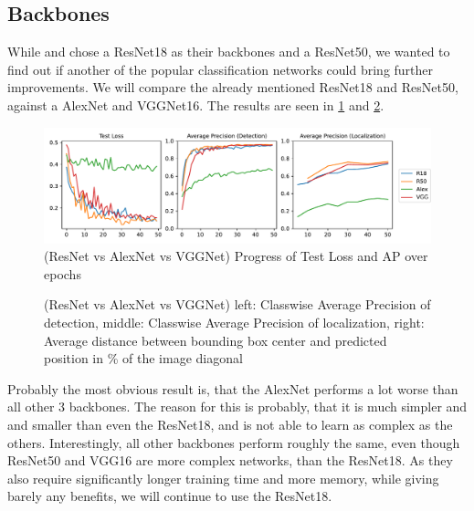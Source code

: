 \FloatBarrier
\subsection{Backbones}

While \cite{Vardazaryan} and \cite{lstm} chose a ResNet18 as their backbones and \cite{classpeak} a ResNet50, we wanted to find out if another of the popular classification networks could bring further improvements. We will compare the already mentioned ResNet18 and ResNet50, against a AlexNet and VGGNet16. The results are seen in \ref{fig:bb_aps} and \ref{fig:bb_distances}.


\begin{figure}[h]
	\centering
	\includegraphics[width=15cm]{4_experiments/images/3_backbones/APs.pdf}
	\caption{(ResNet vs AlexNet vs VGGNet) Progress of Test Loss and AP over epochs}
	\label{fig:bb_aps}
\end{figure}

\begin{figure}[h]
	\centering
	\caption{(ResNet vs AlexNet vs VGGNet) left: Classwise Average Precision of detection, middle: Classwise Average Precision of localization, right: Average distance between bounding box center and predicted position in \% of the image diagonal}
	\label{fig:bb_distances}
\end{figure}

Probably the most obvious result is, that the AlexNet performs a lot worse than all other 3 backbones. The reason for this is probably, that it is much simpler and and smaller than even the ResNet18, and is not able to learn as complex as the others. Interestingly, all other backbones perform roughly the same, even though ResNet50 and VGG16 are more complex networks, than the ResNet18. As they also require significantly longer training time and more memory, while giving barely any benefits, we will continue to use the ResNet18.

